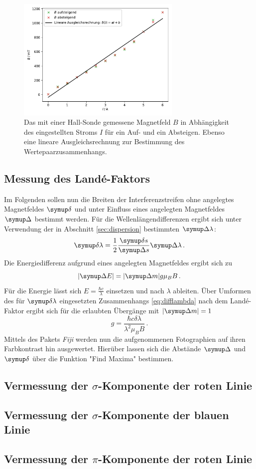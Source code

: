 \begin{figure}
  \centering
  \includegraphics[width=0.7\textwidth]{plots/eichung.pdf}
  \caption{Das mit einer Hall-Sonde gemessene Magnetfeld $B$ in Abhängigkeit des eingestellten Stroms $I$ für ein Auf- und ein Absteigen. Ebenso eine lineare Ausgleichsrechnung zur Bestimmung des Wertepaarzusammenhangs.}
  \label{abb:eichung}
\end{figure}

\subsection{Messung des Landé-Faktors}
Im Folgenden sollen nun die Breiten der Interferenzstreifen ohne angelegtes Magnetfeldes $\deltaup$ und unter Einfluss eines angelegten Magnetfeldes $\Deltaup$ bestimmt werden.
Für die Wellenlängendifferenzen ergibt sich unter Verwendung der in Abschnitt \ref{sec:dispersion} bestimmten $\Deltaup \lambda$:
\begin{equation}
  \deltaup \lambda = \frac{1}{2}\frac{\deltaup s}{\Deltaup s}\Deltaup \lambda\,.
  \label{eq:difflambda}
\end{equation}
Die Energiedifferenz aufgrund eines angelegten Magnetfeldes ergibt sich zu
\begin{equation}
  |\Deltaup E| = |\Deltaup m| g \mu_B B\,.
\end{equation}
Für die Energie lässt sich $E=\frac{\hbar c}{\lambda}$ einsetzen und nach $\lambda$ ableiten.
Über Umformen des für $\deltaup \lambda$ eingesetzten Zusammenhangs \eqref{eq:difflambda} nach dem Landé-Faktor ergibt sich für die erlaubten Übergänge mit $|\Deltaup m|=1$
\begin{equation}
  g=\frac{\hbar c \delta \lambda}{\lambda^2 \mu_B B}\,.
\end{equation}
Mittels des Pakets \textit{Fiji} werden nun die aufgenommenen Fotographien auf ihren Farbkontrast hin ausgewertet.
Hierüber lassen sich die Abstände $\Deltaup$ und $\deltaup$ über die Funktion "Find Maxima" bestimmen.

\subsection{Vermessung der \texorpdfstring{$\sigma$}{sigma}-Komponente der roten Linie}

\subsection{Vermessung der \texorpdfstring{$\sigma$}{sigma}-Komponente der blauen Linie}

\subsection{Vermessung der \texorpdfstring{$\pi$}{pi}-Komponente der roten Linie}
